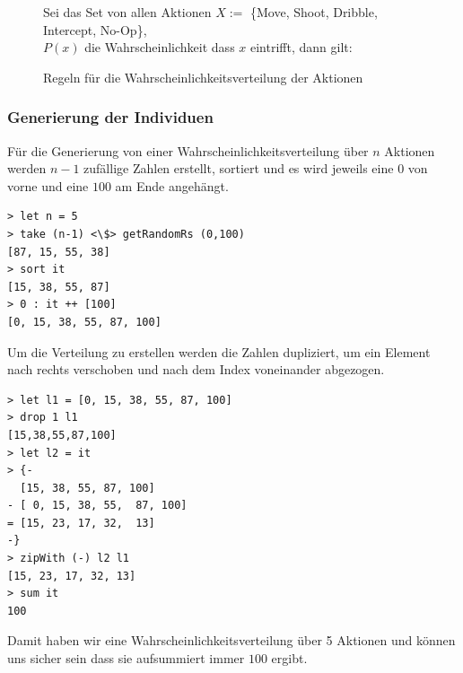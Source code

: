             \begin{figure}[H]
                \begin{mdframed}
                    Sei das Set von allen Aktionen $ X := $ \{Move, Shoot, Dribble, Intercept, No-Op\}, \\
                    $P(x)$ die Wahrscheinlichkeit dass $x$ eintrifft, dann gilt: \\[2mm]
                    \hspace*{25mm} 
                \end{mdframed}
                \renewcommand{\figurename}{Lemma}
                \caption{\label{kodierung} Regeln für die Wahrscheinlichkeitsverteilung der Aktionen}
            \end{figure}


            \subsubsection*{Generierung der Individuen}
            Für die Generierung von einer Wahrscheinlichkeitsverteilung über $n$ Aktionen werden $n-1$ zufällige Zahlen erstellt, sortiert und es wird jeweils eine $0$ von vorne und eine $100$ am Ende angehängt.

            \begin{mdframed}
            \begin{verbatim}
> let n = 5
> take (n-1) <\$> getRandomRs (0,100)
[87, 15, 55, 38]
> sort it
[15, 38, 55, 87]
> 0 : it ++ [100]
[0, 15, 38, 55, 87, 100]
            \end{verbatim}
            \end{mdframed}
            \noindent
            Um die Verteilung zu erstellen werden die Zahlen dupliziert, um ein Element nach rechts verschoben und nach dem Index voneinander abgezogen.
            \begin{mdframed}
            \begin{verbatim}
> let l1 = [0, 15, 38, 55, 87, 100]
> drop 1 l1
[15,38,55,87,100]
> let l2 = it
> {-
  [15, 38, 55, 87, 100]
- [ 0, 15, 38, 55,  87, 100]
= [15, 23, 17, 32,  13]
-}
> zipWith (-) l2 l1
[15, 23, 17, 32, 13]
> sum it
100
            \end{verbatim}
            \end{mdframed}
            \noindent
            Damit haben wir eine Wahrscheinlichkeitsverteilung über 5 Aktionen und können uns sicher sein dass sie aufsummiert immer $100$ ergibt.

